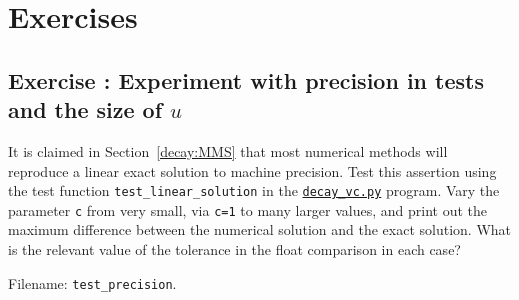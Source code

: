 \documentclass[graybox,sectrefs,envcountresetchap,open=right,final]{svmonodo}
\newenvironment{doconceexercise}{}{}
\newcounter{doconceexercisecounter}
\begin{document}
\section{Exercises}



\begin{doconceexercise}

\subsection*{Exercise \thedoconceexercisecounter: Experiment with precision in tests and the size of $u$}

\label{decay:fd2:exer:precision}

It is claimed in Section~\ref{decay:MMS} that most numerical methods will
reproduce a linear exact solution to machine precision. Test this
assertion using the test function \Verb!test_linear_solution! in the
\href{{http://tinyurl.com/ofkw6kc/genz/decay_vc.py}}{\nolinkurl{decay_vc.py}} program.
Vary the parameter \texttt{c} from very small, via \texttt{c=1} to many larger values,
and print out the maximum difference between the numerical solution
and the exact solution. What is the relevant value of the tolerance
in the float comparison in each case?


\noindent Filename: \Verb!test_precision!.

\end{doconceexercise}
\end{document}
